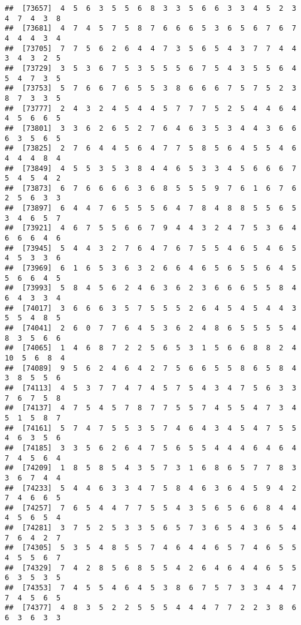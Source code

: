 \documentclass[
]{book}
\begin{document}
\begin{verbatim}
##  [73657]  4  5  6  3  5  5  6  8  3  3  5  6  6  3  3  4  5  2  3  4  7  4  3  8
##  [73681]  4  7  4  5  7  5  8  7  6  6  6  5  3  6  5  6  7  6  7  4  4  4  3  4
##  [73705]  7  7  5  6  2  6  4  4  7  3  5  6  5  4  3  7  7  4  4  3  4  3  2  5
##  [73729]  3  5  3  6  7  5  3  5  5  5  6  7  5  4  3  5  5  6  4  5  4  7  3  5
##  [73753]  5  7  6  6  7  6  5  5  3  8  6  6  6  7  5  7  5  2  3  8  7  3  3  5
##  [73777]  2  4  3  2  4  5  4  4  5  7  7  7  5  2  5  4  4  6  4  4  5  6  6  5
##  [73801]  3  3  6  2  6  5  2  7  6  4  6  3  5  3  4  4  3  6  6  6  3  5  6  5
##  [73825]  2  7  6  4  4  5  6  4  7  7  5  8  5  6  4  5  5  4  6  4  4  4  8  4
##  [73849]  4  5  5  3  5  3  8  4  4  6  5  3  3  4  5  6  6  6  7  5  4  5  4  2
##  [73873]  6  7  6  6  6  6  3  6  8  5  5  5  9  7  6  1  6  7  6  2  5  6  3  3
##  [73897]  6  4  4  7  6  5  5  5  6  4  7  8  4  8  8  5  5  6  5  3  4  6  5  7
##  [73921]  4  6  7  5  5  6  6  7  9  4  4  3  2  4  7  5  3  6  4  6  6  6  4  6
##  [73945]  5  4  4  3  2  7  6  4  7  6  7  5  5  4  6  5  4  6  5  4  5  3  3  6
##  [73969]  6  1  6  5  3  6  3  2  6  6  4  6  5  6  5  5  6  4  5  5  6  6  4  5
##  [73993]  5  8  4  5  6  2  4  6  3  6  2  3  6  6  6  5  5  8  4  6  4  3  3  4
##  [74017]  3  6  6  6  3  5  7  5  5  5  2  6  4  5  4  5  4  4  3  5  5  4  8  5
##  [74041]  2  6  0  7  7  6  4  5  3  6  2  4  8  6  5  5  5  5  4  8  3  5  6  6
##  [74065]  1  4  6  8  7  2  2  5  6  5  3  1  5  6  6  8  8  2  4 10  5  6  8  4
##  [74089]  9  5  6  2  4  6  4  2  7  5  6  6  5  5  8  6  5  8  4  3  8  5  5  6
##  [74113]  4  5  3  7  7  4  7  4  5  7  5  4  3  4  7  5  6  3  3  7  6  7  5  8
##  [74137]  4  7  5  4  5  7  8  7  7  5  5  7  4  5  5  4  7  3  4  5  1  5  8  7
##  [74161]  5  7  4  7  5  5  3  5  7  4  6  4  3  4  5  4  7  5  5  4  6  3  5  6
##  [74185]  3  3  5  6  2  6  4  7  5  6  5  5  4  4  4  6  4  6  4  7  4  5  6  4
##  [74209]  1  8  5  8  5  4  3  5  7  3  1  6  8  6  5  7  7  8  3  3  6  7  4  4
##  [74233]  5  4  4  6  3  3  4  7  5  8  4  6  3  6  4  5  9  4  2  7  4  6  6  5
##  [74257]  7  6  5  4  4  7  7  5  5  4  3  5  6  5  6  6  8  4  4  4  5  6  5  4
##  [74281]  3  7  5  2  5  3  3  5  6  5  7  3  6  5  4  3  6  5  4  7  6  4  2  7
##  [74305]  5  3  5  4  8  5  5  7  4  6  4  4  6  5  7  4  6  5  5  4  5  5  6  7
##  [74329]  7  4  2  8  5  6  8  5  5  4  2  6  4  6  4  4  6  5  5  6  3  5  3  5
##  [74353]  7  4  5  5  4  6  4  5  3  8  6  7  5  7  3  3  4  4  7  7  4  5  6  5
##  [74377]  4  8  3  5  2  2  5  5  5  4  4  4  7  7  2  2  3  8  6  6  3  6  3  3

\end{verbatim}
\end{document}

